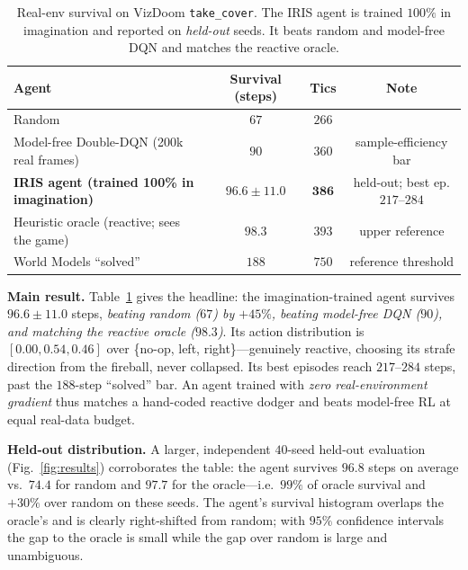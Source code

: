 \documentclass[11pt]{article}
\begin{document}
\begin{table}[t]
\centering
\caption{Real-env survival on VizDoom \texttt{take\_cover}. The IRIS agent is trained $100\%$ in
imagination and reported on \emph{held-out} seeds. It beats random and model-free DQN and matches the
reactive oracle.}
\label{tab:main}
\begin{tabular}{lccc}
\toprule
Agent & Survival (steps) & Tics & Note\\
\midrule
Random & $67$ & $266$ & \\
Model-free Double-DQN (200k real frames) & $90$ & $360$ & sample-efficiency bar\\
\textbf{IRIS agent (trained 100\% in imagination)} & $\mathbf{96.6\pm11.0}$ & $\mathbf{386}$ & held-out; best ep. $217$--$284$\\
Heuristic oracle (reactive; sees the game) & $98.3$ & $393$ & upper reference\\
\midrule
World Models ``solved'' & $188$ & $750$ & reference threshold\\
\bottomrule
\end{tabular}
\end{table}

\textbf{Main result.} Table~\ref{tab:main} gives the headline: the imagination-trained agent survives
$96.6\pm11.0$ steps, \emph{beating random ($67$) by $+45\%$, beating model-free DQN ($90$), and matching
the reactive oracle ($98.3$)}. Its action distribution is $[0.00,0.54,0.46]$ over \{no-op, left,
right\}---genuinely reactive, choosing its strafe direction from the fireball, never collapsed. Its best
episodes reach $217$--$284$ steps, past the $188$-step ``solved'' bar. An agent trained with \emph{zero
real-environment gradient} thus matches a hand-coded reactive dodger and beats model-free RL at equal
real-data budget.

\textbf{Held-out distribution.} A larger, independent $40$-seed held-out evaluation (Fig.~\ref{fig:results})
corroborates the table: the agent survives $\mathbf{96.8}$ steps on average vs.\ $74.4$ for random and
$97.7$ for the oracle---i.e.\ $99\%$ of oracle survival and $+30\%$ over random on these seeds. The agent's
survival histogram overlaps the oracle's and is clearly right-shifted from random; with $95\%$ confidence
intervals the gap to the oracle is small while the gap over random is large and unambiguous.
\end{document}
